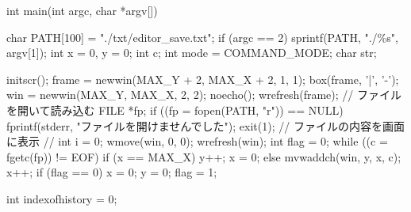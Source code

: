 \documentclass[a4paper,11pt]{jsarticle}
\begin{document}
int main(int argc, char *argv[])
{
    char PATH[100] = "./txt/editor_save.txt";
    if (argc == 2)
    {
        sprintf(PATH, "./\%s", argv[1]);
    }
    int x = 0, y = 0;
    int c;
    int mode = COMMAND_MODE;
    char str;

    initscr();
    frame = newwin(MAX_Y + 2, MAX_X + 2, 1, 1);
    box(frame, '|', '-');
    win = newwin(MAX_Y, MAX_X, 2, 2);
    noecho();
    wrefresh(frame);
    // ファイルを開いて読み込む
    FILE *fp;
    if ((fp = fopen(PATH, "r")) == NULL)
    {
        fprintf(stderr, "ファイルを開けませんでした\n");
        exit(1);
    }
    // ファイルの内容を画面に表示
    // int i = 0;
    wmove(win, 0, 0);
    wrefresh(win);
    int flag = 0;
    while ((c = fgetc(fp)) != EOF)
    {
        if (x == MAX_X)
        {
            y++;
            x = 0;
        }
        else
        {
            mvwaddch(win, y, x, c);
            x++;
        }
    }
    if (flag == 0)
    {
        x = 0;
        y = 0;
        flag = 1;
    }

    int indexofhistory = 0;

}
\end{document}
